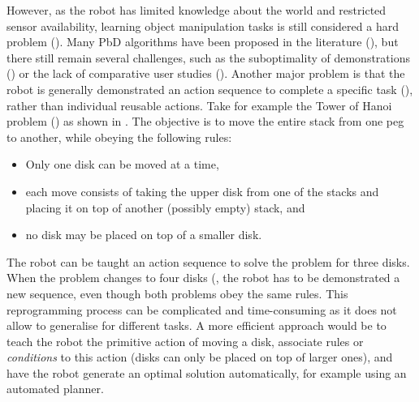 However, as the robot has limited knowledge about the world and restricted sensor availability, learning object manipulation tasks is still considered a hard problem (\cite{ekvall2008robot}).
Many PbD algorithms have been proposed in the literature (\cite{argall2009survey,billing2010formalism}), but there still remain several challenges, such as the suboptimality of demonstrations (\cite{chen2003programing,kaiser1995obtaining}) or the lack of comparative user studies (\cite{suay2012practical}).
Another major problem is that the robot is generally demonstrated an action sequence to complete a specific task (\cite{orendt2016robot,peppoloni2014ros}), rather than individual reusable actions.
Take for example the Tower of Hanoi problem (\cite{douglas1985metamagical}) as shown in .
The objective is to move the entire stack from one peg to another, while obeying the following rules:
\begin{itemize}
\item Only one disk can be moved at a time,
\item each move consists of taking the upper disk from one of the stacks and placing it on top of another (possibly empty) stack, and
\item no disk may be placed on top of a smaller disk.
\end{itemize}

The robot can be taught an action sequence to solve the problem for three disks.
When the problem changes to four disks (, the robot has to be demonstrated a new sequence, even though both problems obey the same rules.
This reprogramming process can be complicated and time-consuming as it does not allow to generalise for different tasks.
A more efficient approach would be to teach the robot the primitive action of moving a disk, associate rules or \textit{conditions} to this action (\eg disks can only be placed on top of larger ones), and have the robot generate an optimal solution automatically, for example using an automated planner.


